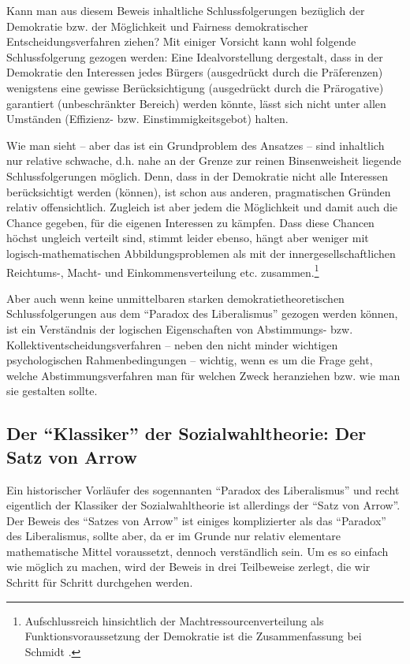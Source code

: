 Kann man aus diesem Beweis inhaltliche Schluss\-fol\-ger\-ung\-en be\-züg\-lich
der Demokratie bzw. der Möglichkeit und Fairness demokratischer
Entscheidungsverfahren ziehen? Mit einiger Vorsicht kann wohl folgende
Schlussfolgerung gezogen werden: Eine Idealvorstellung dergestalt, dass in der
Demokratie den Interessen jedes Bürgers (ausgedrückt durch die Präferenzen)
wenigstens eine gewisse Berücksichtigung (ausgedrückt durch die Prärogative)
garantiert (unbeschränkter Bereich) werden könnte, lässt sich nicht unter allen
Umständen (Effizienz- bzw. Einstimmigkeitsgebot) halten.

Wie man sieht -- aber das ist ein Grundproblem des Ansatzes -- sind inhaltlich
nur relative schwache, d.h. nahe an der Grenze zur reinen Binsenweisheit
liegende Schlussfolgerungen möglich. Denn, dass in der Demokratie nicht alle
Interessen berücksichtigt werden (können), ist schon aus anderen, pragmatischen
Gründen relativ offensichtlich. Zugleich ist aber jedem die Möglichkeit und damit
auch die Chance gegeben, für die eigenen Interessen zu kämpfen. Dass diese
Chancen höchst ungleich verteilt sind, stimmt leider ebenso, hängt aber weniger
mit logisch-mathematischen Abbildungsproblemen als mit der
innergesellschaftlichen Reichtums-, Macht- und Einkommensverteilung etc.
zusammen.\footnote{Aufschlussreich hinsichtlich der Machtressourcenverteilung
als Funktionsvoraussetzung der Demokratie ist die Zusammenfassung bei Schmidt
\cite[S. 438ff.]{schmidt:2000}.}

Aber auch wenn keine
unmittelbaren starken demokratietheoretischen Schlussfolgerungen aus dem
"`Paradox des Liberalismus"' gezogen werden können, ist ein Verständnis der
logischen Eigenschaften von Abstimmungs- bzw. Kollektiventscheidungsverfahren
-- neben den nicht minder wichtigen psychologischen Rahmenbedingungen --
wichtig, wenn es um die Frage geht, welche Abstimmungsverfahren man für welchen
Zweck heranziehen bzw. wie man sie gestalten sollte.

\subsection{Der "`Klassiker"' der Sozialwahltheorie: Der Satz von Arrow}
\label{SatzVonArrow}
Ein historischer Vorläufer des sogennanten "`Paradox des Liberalismus"' und
recht eigentlich der Klassiker der Sozialwahltheorie ist allerdings der "`Satz
von Arrow"'. Der Beweis des "`Satzes von Arrow"' ist einiges komplizierter als
das "`Paradox"' des Liberalismus, sollte aber, da er im Grunde nur relativ
elementare mathematische Mittel voraussetzt, dennoch verständlich sein. Um es
so einfach wie möglich zu machen, wird der Beweis in drei Teilbeweise zerlegt,
die wir Schritt für Schritt durchgehen werden. 

